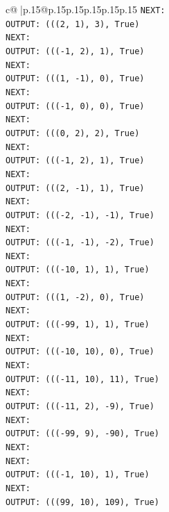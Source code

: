 \documentclass{article}
\begin{document}
{\begin{supertabular}{c@{$\;$}|p{.15\linewidth}@{}p{.15\linewidth}p{.15\linewidth}p{.15\linewidth}p{.15\linewidth}p{.15\linewidth}}
{{{\texttt{NEXT:} \\
\texttt{OUTPUT: (((2, 1), 3), True)} \\
\texttt{NEXT:} \\
\texttt{OUTPUT: ((({-}1, 2), 1), True)} \\
\texttt{NEXT:} \\
\texttt{OUTPUT: (((1, {-}1), 0), True)} \\
\texttt{NEXT:} \\
\texttt{OUTPUT: ((({-}1, 0), 0), True)} \\
\texttt{NEXT:} \\
\texttt{OUTPUT: (((0, 2), 2), True)} \\
\texttt{NEXT:} \\
\texttt{OUTPUT: ((({-}1, 2), 1), True)} \\
\texttt{NEXT:} \\
\texttt{OUTPUT: (((2, {-}1), 1), True)} \\
\texttt{NEXT:} \\
\texttt{OUTPUT: ((({-}2, {-}1), {-}1), True)} \\
\texttt{NEXT:} \\
\texttt{OUTPUT: ((({-}1, {-}1), {-}2), True)} \\
\texttt{NEXT:} \\
\texttt{OUTPUT: ((({-}10, 1), 1), True)} \\
\texttt{NEXT:} \\
\texttt{OUTPUT: (((1, {-}2), 0), True)} \\
\texttt{NEXT:} \\
\texttt{OUTPUT: ((({-}99, 1), 1), True)} \\
\texttt{NEXT:} \\
\texttt{OUTPUT: ((({-}10, 10), 0), True)} \\
\texttt{NEXT:} \\
\texttt{OUTPUT: ((({-}11, 10), 11), True)} \\
\texttt{NEXT:} \\
\texttt{OUTPUT: ((({-}11, 2), {-}9), True)} \\
\texttt{NEXT:} \\
\texttt{OUTPUT: ((({-}99, 9), {-}90), True)} \\
\texttt{NEXT:} \\
\texttt{NEXT:} \\
\texttt{OUTPUT: ((({-}1, 10), 1), True)} \\
\texttt{NEXT:} \\
\texttt{OUTPUT: (((99, 10), 109), True)} \\
}}}
\end{supertabular}}
\end{document}
